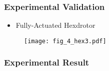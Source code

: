 \begin{frame} %
\frametitle{Experimental Validation} 
	\begin{itemize} 
	\item Fully-Actuated Hexdrotor
	\end{itemize}
		\begin{figure}
		\centering	
		\hspace*{0.05\columnwidth}
		\end{figure}
	\begin{figure} %
    \centering\texttt{[image: fig\_4\_hex3.pdf]}
  	\end{figure}		
\end{frame}   %


\begin{frame} %
\frametitle{Experimental Result} 
\centerline{
}
\end{frame}   %

